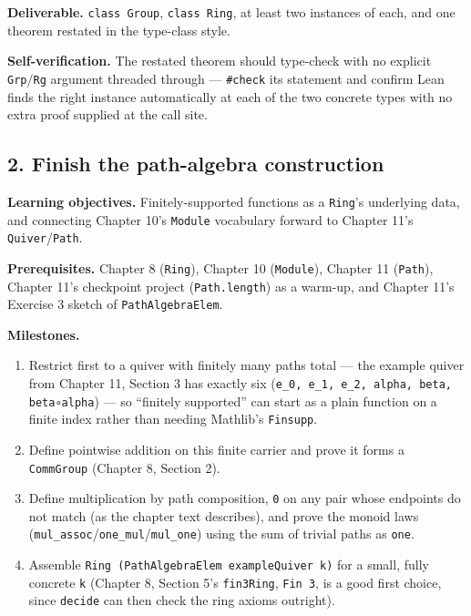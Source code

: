 \textbf{Deliverable.} \texttt{class Group}, \texttt{class Ring}, at least two instances of each, and one theorem restated in the type-class style.

\textbf{Self-verification.} The restated theorem should type-check with no explicit \texttt{Grp}/\texttt{Rg} argument threaded through --- \texttt{\#check} its statement and confirm Lean finds the right instance automatically at each of the two concrete types with no extra proof supplied at the call site.

\subsection{2. Finish the path-algebra construction}\label{sec:13-next-steps:03-next-projects:3}

\textbf{Learning objectives.} Finitely-supported functions as a \texttt{Ring}'s underlying data, and connecting Chapter 10's \texttt{Module} vocabulary forward to Chapter 11's \texttt{Quiver}/\texttt{Path}.

\textbf{Prerequisites.} Chapter 8 (\texttt{Ring}), Chapter 10 (\texttt{Module}), Chapter 11 (\texttt{Path}), Chapter 11's checkpoint project (\texttt{Path.length}) as a warm-up, and Chapter 11's Exercise 3 sketch of \texttt{PathAlgebraElem}.

\textbf{Milestones.}

\begin{enumerate}
\def\labelenumi{\arabic{enumi}.}
\tightlist
\item
  Restrict first to a quiver with finitely many paths total --- the example quiver from Chapter 11, Section 3 has exactly six (\texttt{e\_\allowbreak{}0, e\_\allowbreak{}1, e\_\allowbreak{}2, alpha, beta, beta∘alpha}) --- so ``finitely supported'' can start as a plain function on a finite index rather than needing Mathlib's \texttt{Finsupp}.
\item
  Define pointwise addition on this finite carrier and prove it forms a \texttt{CommGroup} (Chapter 8, Section 2).
\item
  Define multiplication by path composition, \texttt{0} on any pair whose endpoints do not match (as the chapter text describes), and prove the monoid laws (\texttt{mul\_\allowbreak{}assoc}/\texttt{one\_\allowbreak{}mul}/\texttt{mul\_\allowbreak{}one}) using the sum of trivial paths as \texttt{one}.
\item
  Assemble \texttt{Ring (PathAlgebraElem exampleQuiver k)} for a small, fully concrete \texttt{k} (Chapter 8, Section 5's \texttt{fin3Ring}, \texttt{Fin 3}, is a good first choice, since \texttt{decide} can then check the ring axioms outright).
\end{enumerate}

